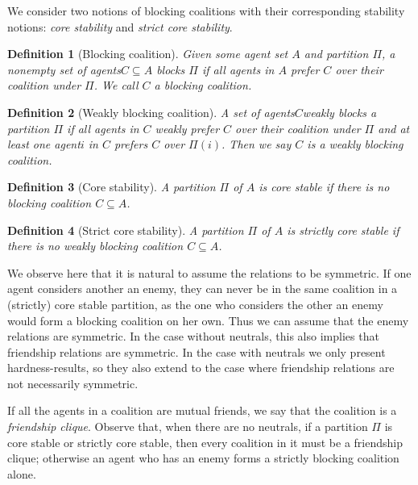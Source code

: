 \documentclass[a4paper,fleqn]{cas-sc}
\newcommand{\agent}{agent\xspace}
\newcommand{\agents}{agents\xspace}
\newcommand{\agentSet}{\ensuremath{A}\xspace}
\newcommand{\partition}{\ensuremath{\Pi}\xspace}
\newcommand{\coalition}{\ensuremath{C}\xspace}
\newcommand{\coalitionOfi}[1]{\ensuremath{\partition(#1)}\xspace}
\newtheorem{definition}{Definition}
\newcommand{\myemph}[1]{{\color{green!25!black}\emph{#1}}}
\newcommand{\fcliq}{friendship clique\xspace}
\begin{document}
We consider two notions of blocking coalitions with their corresponding stability notions: \myemph{core stability} and \myemph{strict core stability}.
\begin{definition}[Blocking coalition]
    Given some \agent set \agentSet and partition \partition, a nonempty set of \agents $\coalition \subseteq \agentSet$ \emph{blocks} \partition if all \agents in \agentSet prefer \coalition over their coalition under \partition. We call \coalition a \emph{blocking coalition}.
\end{definition}
\begin{definition}[Weakly blocking coalition]
    A set of \agents \coalition \emph{weakly blocks} a partition \partition if all agents in \coalition weakly prefer \coalition over their coalition under \partition and at least one \agent $i$ in \coalition prefers \coalition over $\coalitionOfi{i}$. Then we say \coalition is a \emph{weakly blocking coalition}. 
\end{definition}

\begin{definition}[Core stability]
	A partition \partition of \agentSet is \textit{core stable} if there is no blocking coalition $\coalition \subseteq \agentSet$.
\end{definition}

\begin{definition}[Strict core stability]\label{def:SCE}
    A partition \partition of \agentSet is \textit{strictly core stable} if there is no weakly blocking coalition $\coalition \subseteq \agentSet$.
\end{definition}

We observe here that it is natural to assume the relations to be symmetric.
If one agent considers another an enemy, they can never be in the same coalition in a (strictly) core stable partition, as the one who considers the other an enemy would form a blocking coalition on her own.
Thus we can assume that the enemy relations are symmetric.
In the case without neutrals, this also implies that friendship relations are symmetric.
In the case with neutrals we only present hardness-results, so they also extend to the case where friendship relations are not necessarily symmetric. 

If all the agents in a coalition are mutual friends, we say that the coalition is a \myemph{\fcliq}. Observe that, when there are no neutrals, if a partition \partition is core stable or strictly core stable, then every coalition in it must be a \fcliq; otherwise an agent who has an enemy forms a strictly blocking coalition alone.
\end{document}

